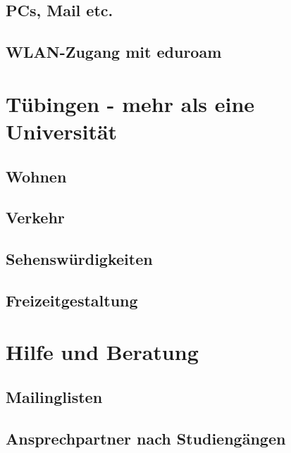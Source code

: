 \documentclass[12pt, a4paper]{article}
\newif\ifinfo
\begin{document}
\pagebreak
\subsection{PCs, Mail etc.}
	
\subsection{WLAN-Zugang mit eduroam}
	

\section{Tübingen - mehr als eine Universität}
\subsection{Wohnen}


\subsection{Verkehr}


\subsection{Sehenswürdigkeiten}

\pagebreak
\subsection{Freizeitgestaltung}


\newpage
\section{Hilfe und Beratung}
\ifinfo
	\subsection{Don't panic! -- Erste Hilfe: fsi}
	
\else
	
\fi

\subsection{Mailinglisten}
\ifinfo
	
\else
	
\fi

\ifinfo
	\subsection{Ansprechpartner nach Studiengängen}
	
\end{document}
